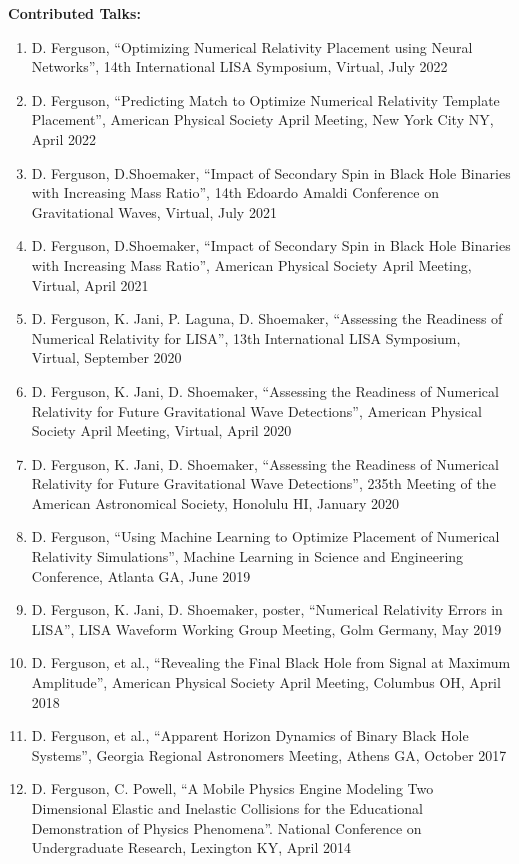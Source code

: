 \documentclass[11pt]{article}
\begin{document}
\begin{flushleft}
  \textbf{Contributed Talks:}
  \begin{enumerate}
  \item D. Ferguson, ``Optimizing Numerical Relativity Placement using Neural Networks'', 14th International LISA Symposium, Virtual, July 2022
  \item D. Ferguson, ``Predicting Match to Optimize Numerical Relativity Template Placement'', American Physical Society April Meeting, New York City NY, April 2022
  \item D. Ferguson, D.Shoemaker, ``Impact of Secondary Spin in Black Hole Binaries with Increasing Mass Ratio'', 14th Edoardo Amaldi Conference on Gravitational Waves, Virtual, July 2021
  \item D. Ferguson,  D.Shoemaker, ``Impact of Secondary Spin in Black Hole Binaries with Increasing Mass Ratio'',  American Physical Society April Meeting, Virtual, April 2021
  \item D. Ferguson, K. Jani, P. Laguna, D. Shoemaker, ``Assessing the Readiness of Numerical Relativity for LISA'', 13th International LISA Symposium, Virtual, September 2020
  \item D. Ferguson, K. Jani, D. Shoemaker, ``Assessing the Readiness of Numerical Relativity for Future Gravitational Wave Detections'', American Physical Society April Meeting, Virtual, April 2020
  \item D. Ferguson, K. Jani, D. Shoemaker, ``Assessing the Readiness of Numerical Relativity for Future Gravitational Wave Detections'', 235th Meeting of the American Astronomical Society, Honolulu HI, January 2020
  \item D. Ferguson, ``Using Machine Learning to Optimize Placement of Numerical Relativity Simulations'', Machine Learning in Science and Engineering Conference, Atlanta GA, June 2019
  \item D. Ferguson, K. Jani, D. Shoemaker, poster, ``Numerical Relativity Errors in LISA'', LISA Waveform Working Group Meeting, Golm Germany, May 2019
  \item D. Ferguson, et al., ``Revealing the Final Black Hole from Signal at Maximum Amplitude'', American Physical Society April Meeting, Columbus OH, April 2018
  \item D. Ferguson, et al., ``Apparent Horizon Dynamics of Binary Black Hole Systems'', Georgia Regional Astronomers Meeting, Athens GA, October 2017
  \item D. Ferguson, C. Powell, ``A Mobile Physics Engine Modeling Two Dimensional Elastic and Inelastic Collisions for the Educational Demonstration of Physics Phenomena''. National Conference on Undergraduate Research, Lexington KY, April 2014
  \end{enumerate} 


\end{flushleft}
\end{document}
